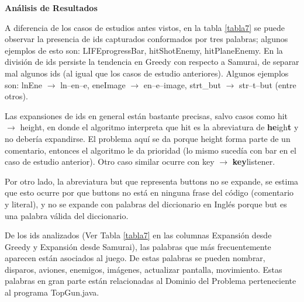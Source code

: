 \noindent \textbf{Análisis de Resultados\\}

A diferencia de los casos de estudios antes vistos, en la tabla \ref{tabla7} se puede observar la presencia de ids capturados conformados por tres palabras; algunos ejemplos de esto son: \textsf{LIFEprogressBar}, \textsf{hitShotEnemy}, \textsf{hitPlaneEnemy}.
En la división de ids persiste la tendencia en Greedy con respecto a Samurai, de separar mal algunos ids (al igual que los casos de estudio anteriores). Algunos ejemplos son: \textsf{lnEne} $\rightarrow$ \textsf{ln--en--e}, \textsf{eneImage}  $\rightarrow$ \textsf{en--e--image}, \textsf{strt\_but} $\rightarrow$ \textsf{str--t--but} (entre otros).

Las expansiones de ids en general están bastante precisas, salvo casos como \textsf{hit} $\rightarrow$ \textsf{height}, en donde el algoritmo interpreta que \textsf{hit} es la abreviatura de \textsf{\textbf{he}igh\textbf{t}} y no debería expandirse. El problema aquí se da porque \textsf{height} forma parte de un comentario, entonces el algoritmo le da prioridad (lo mismo sucedía con \textsf{bar} en el caso de estudio anterior). Otro caso similar ocurre con \textsf{key} $\rightarrow$ \textsf{\textbf{key}listener}.

Por otro lado, la abreviatura \textsf{but} que representa \textsf{buttons} no se expande, se estima que esto ocurre por que \textsf{buttons} no está en ninguna frase del código (comentario y literal), y no se expande con palabras del diccionario en Inglés porque \textsf{but} es una palabra válida del diccionario.

De los ids analizados (Ver Tabla \ref{tabla7} en las columnas Expansión desde Greedy y Expansión desde Samurai), las palabras que más frecuentemente aparecen están asociados al juego. De estas palabras se pueden nombrar, disparos, aviones, enemigos, imágenes, actualizar pantalla, movimiento. Estas palabras en gran parte están relacionadas al Dominio del Problema perteneciente al programa TopGun.java.

